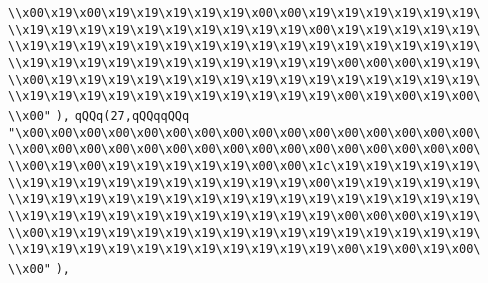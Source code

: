 \verb|\\x00\x19\x00\x19\x19\x19\x19\x19\x00\x00\x19\x19\x19\x19\x19\x19\|\newline
\verb|\\x19\x19\x19\x19\x19\x19\x19\x19\x19\x19\x00\x19\x19\x19\x19\x19\|\newline
\verb|\\x19\x19\x19\x19\x19\x19\x19\x19\x19\x19\x19\x19\x19\x19\x19\x19\|\newline
\verb|\\x19\x19\x19\x19\x19\x19\x19\x19\x19\x19\x19\x00\x00\x00\x19\x19\|\newline
\verb|\\x00\x19\x19\x19\x19\x19\x19\x19\x19\x19\x19\x19\x19\x19\x19\x19\|\newline
\verb|\\x19\x19\x19\x19\x19\x19\x19\x19\x19\x19\x19\x00\x19\x00\x19\x00\|\newline
\verb|\\x00"|\newline
\verb|),|\newline
\verb|qQQq(27,qQQqqQQq|\newline
\verb|"\x00\x00\x00\x00\x00\x00\x00\x00\x00\x00\x00\x00\x00\x00\x00\x00\|\newline
\verb|\\x00\x00\x00\x00\x00\x00\x00\x00\x00\x00\x00\x00\x00\x00\x00\x00\|\newline
\verb|\\x00\x19\x00\x19\x19\x19\x19\x19\x00\x00\x1c\x19\x19\x19\x19\x19\|\newline
\verb|\\x19\x19\x19\x19\x19\x19\x19\x19\x19\x19\x00\x19\x19\x19\x19\x19\|\newline
\verb|\\x19\x19\x19\x19\x19\x19\x19\x19\x19\x19\x19\x19\x19\x19\x19\x19\|\newline
\verb|\\x19\x19\x19\x19\x19\x19\x19\x19\x19\x19\x19\x00\x00\x00\x19\x19\|\newline
\verb|\\x00\x19\x19\x19\x19\x19\x19\x19\x19\x19\x19\x19\x19\x19\x19\x19\|\newline
\verb|\\x19\x19\x19\x19\x19\x19\x19\x19\x19\x19\x19\x00\x19\x00\x19\x00\|\newline
\verb|\\x00"|\newline
\verb|),|\newline

